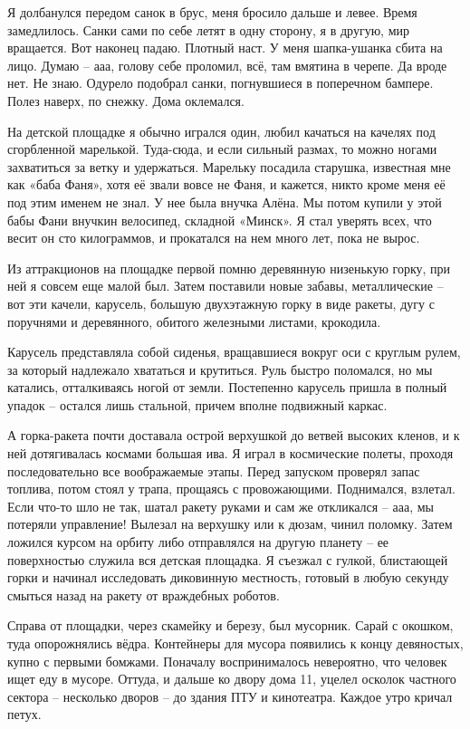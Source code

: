 Я долбанулся передом санок в брус, меня бросило дальше и левее. Время замедлилось. Санки сами по себе летят в одну сторону, я в другую, мир вращается. Вот наконец падаю. Плотный наст. У меня шапка-ушанка сбита на лицо. Думаю – ааа, голову себе проломил, всё, там вмятина в черепе. Да вроде нет. Не знаю. Одурело подобрал санки, погнувшиеся в поперечном бампере. Полез наверх, по снежку. Дома оклемался.

На детской площадке я обычно игрался один, любил качаться на качелях под сгорбленной марелькой. Туда-сюда, и если сильный размах, то можно ногами захватиться за ветку и удержаться. Марельку посадила старушка, известная мне как «баба Фаня», хотя её звали вовсе не Фаня, и кажется, никто кроме меня её под этим именем не знал. У нее была внучка Алёна. Мы потом купили у этой бабы Фани внучкин велосипед, складной «Минск». Я стал уверять всех, что весит он сто килограммов, и прокатался на нем много лет, пока не вырос.

Из аттракционов на площадке первой помню деревянную низенькую горку, при ней я совсем еще малой был. Затем поставили новые забавы, металлические – вот эти качели, карусель, большую двухэтажную горку в виде ракеты, дугу с поручнями и деревянного, обитого железными листами, крокодила.

Карусель представляла собой сиденья, вращавшиеся вокруг оси с круглым рулем, за который надлежало хвататься и крутиться. Руль быстро поломался, но мы катались, отталкиваясь ногой от земли. Постепенно карусель пришла в полный упадок – остался лишь стальной, причем вполне подвижный каркас.

А горка-ракета почти доставала острой верхушкой до ветвей высоких кленов, и к ней дотягивалась космами большая ива. Я играл в космические полеты, проходя последовательно все воображаемые этапы. Перед запуском проверял запас топлива, потом стоял у трапа, прощаясь с провожающими. Поднимался, взлетал. Если что-то шло не так, шатал ракету руками и сам же откликался – ааа, мы потеряли управление! Вылезал на верхушку или к дюзам, чинил поломку. Затем ложился курсом на орбиту либо отправлялся на другую планету – ее поверхностью служила вся детская площадка. Я съезжал с гулкой, блистающей горки и начинал исследовать диковинную местность, готовый в любую секунду смыться назад на ракету от враждебных роботов.

Справа от площадки, через скамейку и березу, был мусорник. Сарай с окошком, туда опорожнялись вёдра. Контейнеры для мусора появились к концу девяностых, купно с первыми бомжами. Поначалу воспринималось невероятно, что человек ищет еду в мусоре. Оттуда, и дальше ко двору дома 11, уцелел осколок частного сектора – несколько дворов – до здания ПТУ и кинотеатра. Каждое утро кричал петух.


